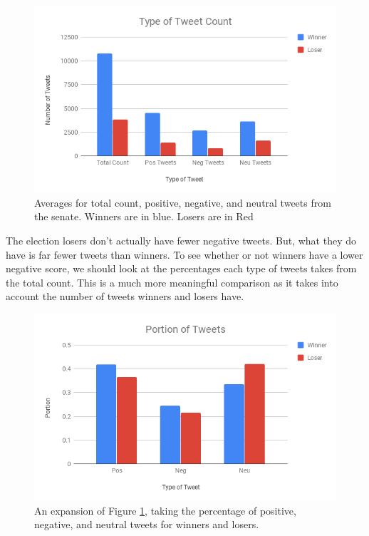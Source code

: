 \documentclass[11pt, twoside, reqno]{book}
\begin{document}
\begin{figure}[H]
\centering
	\includegraphics[scale=0.5]{tweet_type}
	\caption{Averages for total count, positive, negative, and neutral tweets from the senate. Winners are in blue. Losers are in Red}\label{fig:tweet_type}
\end{figure}

The election losers don't actually have fewer negative tweets. But, what they do have is far fewer tweets than winners. To see whether or not winners have a lower negative score, we should look at the percentages each type of tweets takes from the total count. This is a much more meaningful comparison as it takes into account the number of tweets winners and losers have. 

\begin{figure}[H]
\centering
	\includegraphics[scale=0.5]{tweet_breakdown}
	\caption{An expansion of Figure \ref{fig:tweet_type}, taking the percentage of positive, negative, and neutral tweets for winners and losers.}\label{fig:tweet_breakdown}	
\end{figure}
\end{document}
